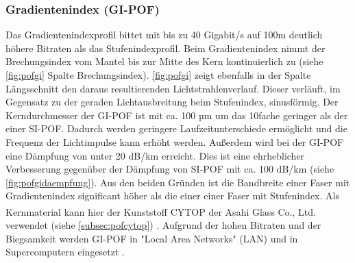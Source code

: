 \subsubsection{Gradientenindex (GI-POF)}

Das Gradientenindexprofil bittet mit bis zu 40 Gigabit/s auf 100m deutlich
höhere Bitraten als das Stufenindexprofil. Beim Gradientenindex nimmt der
Brechungsindex vom Mantel bis zur Mitte des Kern kontinuierlich zu (siehe
\autoref{fig:pofgi} Spalte Brechungsindex). \autoref{fig:pofgi} zeigt ebenfalls
in der Spalte Längsschnitt den daraus resultierenden Lichtstrahlenverlauf.
Dieser verläuft, im Gegensatz zu der geraden Lichtausbreitung beim Stufenindex,
sinusförmig. Der Kerndurchmesser der GI-POF ist mit ca. 100 µm um das 10fache
geringer als der einer SI-POF. Dadurch werden geringere Laufzeitunterschiede
ermöglicht und die Frequenz der Lichtimpulse kann erhöht werden. Außerdem wird
bei der GI-POF eine Dämpfung von unter 20 dB/km erreicht. Dies ist eine
ehrheblicher Verbesserung gegenüber der Dämpfung von SI-POF mit ca. 100 dB/km
(siehe \autoref{fig:pofgidaempfung}). Aus den beiden Gründen ist die Bandbreite
einer Faser mit Gradientenindex significant höher als die einer einer Faser mit
Stufenindex. Als Kernmaterial kann hier der Kunststoff
CYTOP\textsuperscript{\texttrademark} der Asahi Glass Co., Ltd. verwendet (siehe
\autoref{subsec:pofcytop}) \cite{pofacgif}. Aufgrund der hohen Bitraten und der
Biegsamkeit werden GI-POF in "Local Area
Networks" (LAN) und in Supercomputern eingesetzt \cite{poflee}.


